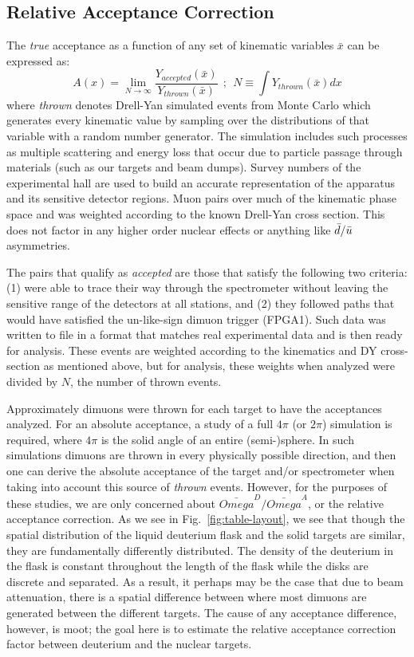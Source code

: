 \subsection{Relative Acceptance Correction}

The \emph{true} acceptance as a function of any set of kinematic variables $\bar{x}$ can be expressed as:
\begin{equation}
A(x) = \lim\limits_{N\rightarrow \infty} \frac{Y_{accepted}(\bar{x})}{Y_{thrown} (\bar{x})}\ \ ;\ \ 
N \equiv \int Y_{thrown}(\bar{x}) dx
\end{equation}
where \emph{thrown} denotes Drell-Yan simulated events from Monte Carlo which generates every kinematic value by sampling over the distributions of that variable with a random number generator. The simulation includes such processes as multiple scattering and energy loss that occur due to particle passage through materials (such as our targets and beam dumps). Survey numbers of the experimental hall are used to build an accurate representation of the apparatus and its sensitive detector regions. Muon pairs over much of the kinematic phase space and was weighted according to the known Drell-Yan cross section. This does not factor in any higher order nuclear effects or anything like $\bar{d}/\bar{u}$ asymmetries. 

The pairs that qualify as \emph{accepted} are those that satisfy the following two criteria: (1) were able to trace their way through the spectrometer without leaving the sensitive range of the detectors at all stations, and (2) they followed paths that would have satisfied the un-like-sign dimuon trigger (FPGA1). Such data was written to file in a format that matches real experimental data and is then ready for analysis. These events are weighted according to the kinematics and DY cross-section as mentioned above, but for analysis, these weights when analyzed were divided by $N$, the number of thrown events.

Approximately \unit[800,000]{dimuons} were thrown for each target to have the acceptances analyzed. For an absolute acceptance, a study of a full $4\pi$ (or $2\pi$) simulation is required, where $4\pi$ is the solid angle of an entire (semi-)sphere. In such simulations dimuons are thrown in every physically possible direction, and then one can derive the absolute acceptance of the target and/or spectrometer when taking into account this source of \emph{thrown} events. However, for the purposes of these studies, we are only concerned about $\bar{Omega}^D/\bar{Omega}^A$, or the relative acceptance correction. As we see in Fig.~\ref{fig:table-layout}, we see that though the spatial distribution of the liquid deuterium flask and the solid targets are similar, they are fundamentally differently distributed. The density of the deuterium in the flask is constant throughout the length of the flask while the disks are discrete and separated. As a result, it perhaps may be the case that due to beam attenuation, there is a spatial difference between where most dimuons are generated between the different targets. The cause of any acceptance difference, however, is moot; the goal here is to estimate the relative acceptance correction factor between deuterium and the nuclear targets.


